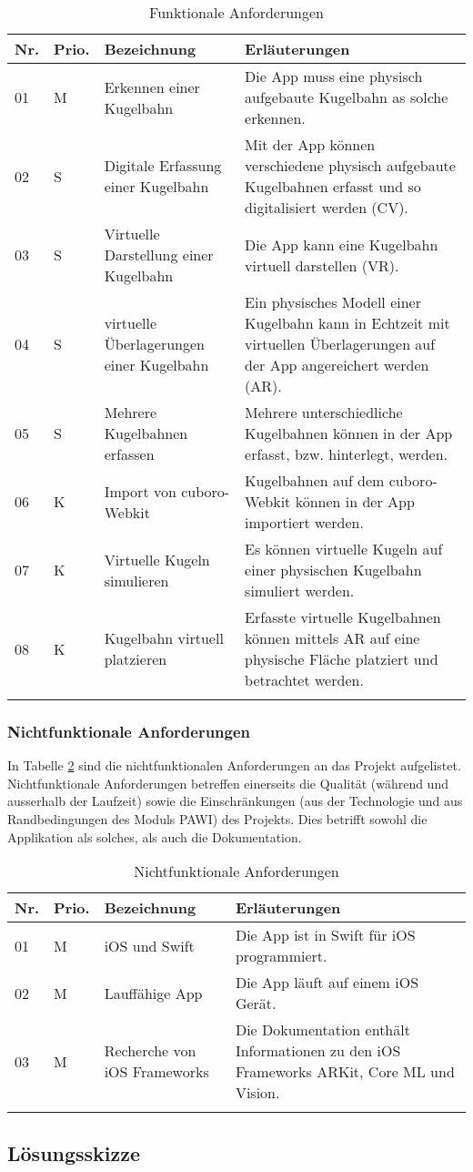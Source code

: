 \begin{longtable}{l l p{4.7cm} p{8cm}}
	\hline
	\textbf{Nr.} & \textbf{Prio.} & \textbf{Bezeichnung} & \textbf{Erläuterungen} \\
	\hline
	01 & M & Erkennen einer Kugelbahn & Die App muss eine physisch aufgebaute Kugelbahn as solche erkennen. \\
	02 & S & Digitale Erfassung einer Kugelbahn & Mit der App können verschiedene physisch aufgebaute Kugelbahnen erfasst und so digitalisiert werden (CV). \\
	03 & S & Virtuelle Darstellung einer Kugelbahn & Die App kann eine Kugelbahn virtuell darstellen (VR). \\
	04 & S & virtuelle Überlagerungen einer Kugelbahn & Ein physisches Modell einer Kugelbahn kann in Echtzeit mit virtuellen Überlagerungen auf der App angereichert werden (AR). \\
	05 & S & Mehrere Kugelbahnen erfassen & Mehrere unterschiedliche Kugelbahnen können in der App erfasst, bzw. hinterlegt, werden. \\
	06 & K & Import von cuboro-Webkit & Kugelbahnen auf dem cuboro-Webkit können in der App importiert werden. \\
	07 & K & Virtuelle Kugeln simulieren & Es können virtuelle Kugeln auf einer physischen Kugelbahn simuliert werden. \\
	08 & K & Kugelbahn virtuell platzieren & Erfasste virtuelle Kugelbahnen können mittels AR auf eine physische Fläche platziert und betrachtet werden. \\
	\hline
	\caption{Funktionale Anforderungen}
	\label{tab:funktionale-anforderungen}
\end{longtable}

\subsubsection{Nichtfunktionale Anforderungen}
In Tabelle \ref{tab:nichtfunktionale-anforderungen} sind die nichtfunktionalen Anforderungen an das Projekt aufgelistet. Nichtfunktionale Anforderungen betreffen einerseits die Qualität (während und ausserhalb der Laufzeit) sowie die Einschränkungen (aus der Technologie und aus Randbedingungen des Moduls PAWI) des Projekts. Dies betrifft sowohl die Applikation als solches, als auch die Dokumentation.

\begin{longtable}{l l p{4.7cm} p{8cm}}
	\hline
	\textbf{Nr.} & \textbf{Prio.} & \textbf{Bezeichnung} & \textbf{Erläuterungen} \\
	\hline
	01 & M & iOS und Swift & Die App ist in Swift für iOS programmiert. \\
	02 & M & Lauffähige App & Die App läuft auf einem iOS Gerät. \\
	03 & M & Recherche von iOS Frameworks & Die Dokumentation enthält Informationen zu den iOS Frameworks ARKit, Core ML und Vision. \\
	\hline
	\caption{Nichtfunktionale Anforderungen}
	\label{tab:nichtfunktionale-anforderungen}
\end{longtable}

\subsection{Lösungsskizze}
